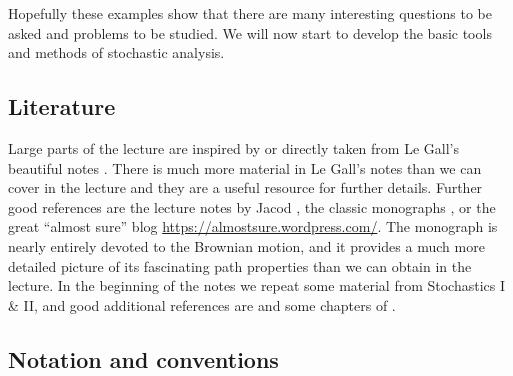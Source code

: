 \documentclass{article}
\newcommand{\1}{\mathbbm{1}}
\begin{document}
Hopefully these examples show that there are many interesting questions to be
asked and problems to be studied. We will now start to develop the basic tools
and methods of stochastic analysis.

\subsection*{Literature}

Large parts of the lecture are inspired by or directly taken from Le Gall's
beautiful notes {\cite{LeGall2016}}. There is much more material in Le Gall's
notes than we can cover in the lecture and they are a useful resource for
further details. Further good references are the lecture notes by Jacod
{\cite{Jacod2008}}, the classic monographs
{\cite{Karatzas1988,Revuz1999,Oksendal2003,Jacod2003,Ethier1986}}, or the
great ``almost sure'' blog
\href{https://almostsure.wordpress.com/}{https://almostsure.wordpress.com/}.
The monograph {\cite{Morters2010}} is nearly entirely devoted to the Brownian
motion, and it provides a much more detailed picture of its fascinating path
properties than we can obtain in the lecture. In the beginning of the notes we
repeat some material from Stochastics I \& II, and good additional references
are {\cite{Klenke2008,Durrett2010,Stroock2011}} and some chapters of
{\cite{Ethier1986}}.

\subsection*{Notation and conventions}
\end{document}

